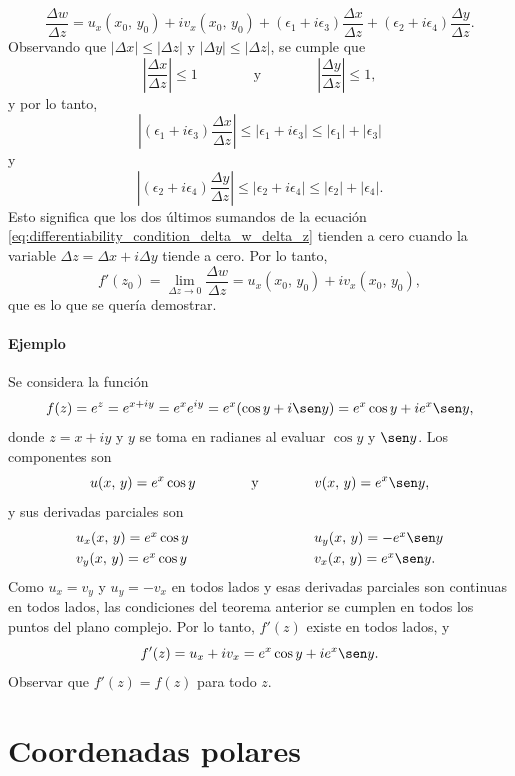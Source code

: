 \documentclass[a4paper]{report}
\begin{document}
\begin{equation}\label{eq:differentiability_condition_delta_w_delta_z}
 \frac{\Delta w}{\Delta z}=u_x(x_0,\,y_0)+iv_x(x_0,\,y_0)+(\epsilon_1+i\epsilon_3)\frac{\Delta x}{\Delta z}+(\epsilon_2+i\epsilon_4)\frac{\Delta y}{\Delta z}.
\end{equation}
Observando que \(|\Delta x|\leq|\Delta z|\) y \(|\Delta y|\leq|\Delta z|\), se cumple que 
\[
 \left|\frac{\Delta x}{\Delta z}\right|\leq1
 \qquad\qquad\textrm{y}\qquad\qquad
 \left|\frac{\Delta y}{\Delta z}\right|\leq1,
\]
y por lo tanto,
\[
 \left|(\epsilon_1+i\epsilon_3)\frac{\Delta x}{\Delta z}\right|\leq|\epsilon_1+i\epsilon_3|\leq|\epsilon_1|+|\epsilon_3|
\]
y
\[
 \left|(\epsilon_2+i\epsilon_4)\frac{\Delta y}{\Delta z}\right|\leq|\epsilon_2+i\epsilon_4|\leq|\epsilon_2|+|\epsilon_4|.
\]
Esto significa que los dos últimos sumandos de la ecuación \ref{eq:differentiability_condition_delta_w_delta_z} tienden a cero cuando la variable \(\Delta z=\Delta x+i\Delta y\) tiende a cero. Por lo tanto,
\[
 f'(z_0)=\lim_{\Delta z\to0}\frac{\Delta w}{\Delta z}=u_x(x_0,\,y_0)+iv_x(x_0,\,y_0),
\]
que es lo que se quería demostrar.

\paragraph{Ejemplo} Se considera la función
\[
 f(z)=e^z=e^{x+iy}=e^xe^{iy}=e^x(\cos y+i\sen y)=e^x\cos y+ie^x\sen y,
\]
donde \(z=x+iy\) y \(y\) se toma en radianes al evaluar \(\cos y\) y \(\sen y\). Los componentes son 
 \[
  u(x,\,y)=e^x\cos y
  \qquad\qquad\textrm{y}\qquad\qquad
  v(x,\,y)=e^x\sen y,
 \]
y sus derivadas parciales son 
\[
 \begin{array}{ll}
  u_x(x,\,y)=e^x\cos y\qquad\qquad\qquad\qquad&u_y(x,\,y)=-e^x\sen y\\[\smallskipamount]
  v_y(x,\,y)=e^x\cos y\qquad\qquad\qquad\qquad&v_x(x,\,y)=e^x\sen y.
 \end{array}
\] 
Como \(u_x=v_y\) y \(u_y=-v_x\) en todos lados y esas derivadas parciales son continuas en todos lados, las condiciones del teorema anterior se cumplen en todos los puntos del plano complejo. Por lo tanto, \(f'(z)\) existe en todos lados, y
\[
 f'(z)=u_x+iv_x=e^x\cos y+ie^x\sen y.
\]
Observar que \(f'(z)=f(z)\) para todo \(z\).

\section{Coordenadas polares}\label{sec:cauchy_riemann_equations_polar}
\end{document}
